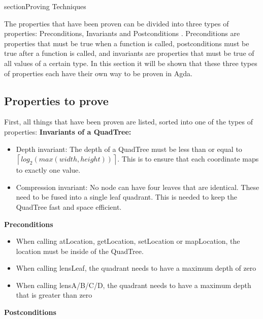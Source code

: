 section{Proving Techniques}

The properties that have been proven can be divided into three types of properties: Preconditions, Invariants and Postconditions \cite{meyer_1992}. Preconditions are properties that must be true when a function is called, postconditions must be true after a function is called, and invariants are properties that must be true of all values of a certain type. In this section it will be shown that these three types of properties each have their own way to be proven in Agda.
\subsection{Properties to prove}

First, all things that have been proven are listed, sorted into one of the types of properties: \linebreak 
\textbf{Invariants of a QuadTree:}
\begin{itemize}
    \item Depth invariant: The depth of a QuadTree must be less than or equal to $\left \lceil{log_{2}( max(width, height))}\right \rceil$. This is to ensure that each coordinate maps to exactly one value.
    \item Compression invariant: No node can have four leaves that are identical. These need to be fused into a single leaf quadrant. This is needed to keep the QuadTree fast and space efficient.
\end{itemize} 
\textbf{Preconditions}
\begin{itemize}
    \item When calling atLocation, getLocation, setLocation or mapLocation, the location must be inside of the QuadTree.
    \item When calling lensLeaf, the quadrant needs to have a maximum depth of zero
    \item When calling lensA/B/C/D, the quadrant needs to have a maximum depth that is greater than zero
\end{itemize} 
\textbf{Postconditions}

